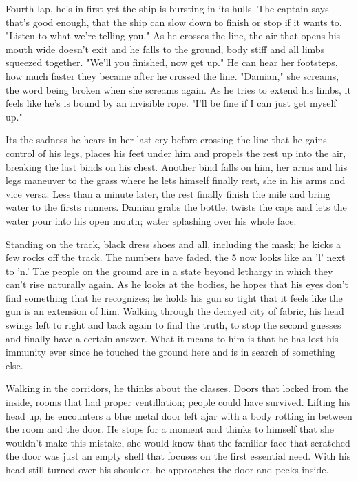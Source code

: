 \begin{Document}
        Fourth lap, he's in first yet the ship is bursting in its hulls. The captain says that's good enough, that the ship can slow down to finish or stop if it
    wants to. "Listen to what we're telling you." As he crosses the line, the air that opens his mouth wide doesn't exit and he falls to the ground, body stiff
    and all limbs squeezed together. "We'll you finished, now get up." He can hear her footsteps, how much faster they became after he crossed the line. "Damian,"
    she screams, the word being broken when she screams again. As he tries to extend his limbs, it feels like he's is bound by an invisible rope. "I'll be fine
    if I can just get myself up." 

        Its the sadness he hears in her last cry before crossing the line that he gains control of his legs, places his feet under him and propels the rest up
    into the air, breaking the last binds on his chest. Another bind falls on him, her arms and his legs maneuver to the grass where he lets himself finally rest,
    she in his arms and vice versa. Less than a minute later, the rest finally finish the mile and bring water to the firsts runners. Damian grabs the bottle, 
    twists the caps and lets the water pour into his open mouth; water splashing over his whole face.

        Standing on the track, black dress shoes and all, including the mask; he kicks a few rocks off the track. The numbers have faded, the 5 now looks like an 
    'l' next to 'n.' The people on the ground are in a state beyond lethargy in which they can't rise naturally again. As he looks at the bodies, he hopes that
    his eyes don't find something that he recognizes; he holds his gun so tight that it feels like the gun is an extension of him. Walking through the decayed
    city of fabric, his head swings left to right and back again to find the truth, to stop the second guesses and finally have a certain answer. What it means
    to him is that he has lost his immunity ever since he touched the ground here and is in search of something else.

        Walking in the corridors, he thinks about the classes. Doors that locked from the inside, rooms that had proper ventillation; people could have survived.
    Lifting his head up, he encounters a blue metal door left ajar with a body rotting in between the room and the door. He stops for a moment and thinks to 
    himself that she wouldn't make this mistake, she would know that the familiar face that scratched the door was just an empty shell that focuses on the first
    essential need. With his head still turned over his shoulder, he approaches the door and peeks inside.


\end{Document}
